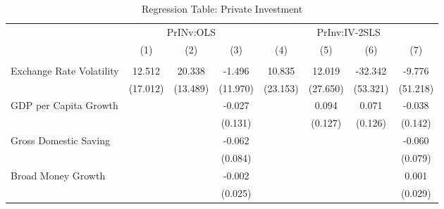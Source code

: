 \begin{table}[H] \def\sym#1{\ifmmode^{#1}\else\(^{#1}\)\fi} \caption{Regression Table: Private Investment} \begin{adjustbox}{max width=\textwidth} \begin{tabular}{l*{7}{c}} \\ \hline\hline
            &\multicolumn{3}{c}{PrINv:OLS}                                    &\multicolumn{4}{c}{PrInv:IV-2SLS}                                                      \\\cmidrule(lr){2-4}\cmidrule(lr){5-8}
            &\multicolumn{1}{c}{(1)}         &\multicolumn{1}{c}{(2)}         &\multicolumn{1}{c}{(3)}         &\multicolumn{1}{c}{(4)}         &\multicolumn{1}{c}{(5)}         &\multicolumn{1}{c}{(6)}         &\multicolumn{1}{c}{(7)}         \\
\hline \addlinespace \multicolumn{7}{l}{} \\  \addlinespace[2pt]
Exchange Rate Volatility&      12.512         &      20.338         &      -1.496         &      10.835         &      12.019         &     -32.342         &      -9.776         \\
            &    (17.012)         &    (13.489)         &    (11.970)         &    (23.153)         &    (27.650)         &    (53.321)         &    (51.218)         \\
\addlinespace
GDP per Capita Growth&                     &                     &      -0.027         &                     &       0.094         &       0.071         &      -0.038         \\
            &                     &                     &     (0.131)         &                     &     (0.127)         &     (0.126)         &     (0.142)         \\
\addlinespace
Gross Domestic Saving&                     &                     &      -0.062         &                     &                     &                     &      -0.060         \\
            &                     &                     &     (0.084)         &                     &                     &                     &     (0.079)         \\
\addlinespace
Broad Money Growth&                     &                     &      -0.002         &                     &                     &                     &       0.001         \\
            &                     &                     &     (0.025)         &                     &                     &                     &     (0.029)         \\

\end{tabular}
\end{adjustbox}
\end{table}
